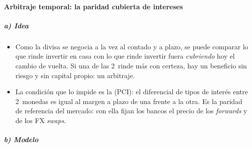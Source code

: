 \documentclass[11pt]{article}
\begin{document}
\paragraph{Arbitraje temporal: la paridad cubierta de intereses}\label{sec:pci}

\subparagraph{a) Idea}

\begin{itemize}
\item Como la divisa se negocia a la vez al contado y a plazo, se puede comparar lo que rinde invertir en casa con lo que rinde invertir fuera \emph{cubriendo} hoy el cambio de vuelta. Si una de las 2~rinde más con certeza, hay un beneficio sin riesgo y sin capital propio: un arbitraje.
\item La condición que lo impide es la  (PCI): el diferencial de tipos de interés entre 2~monedas es igual al margen a plazo de una frente a la otra. Es la paridad de referencia del mercado: con ella fijan los bancos el precio de los \emph{forwards} y de los FX \emph{swaps}.
\end{itemize}

\subparagraph{b) Modelo}
\end{document}
